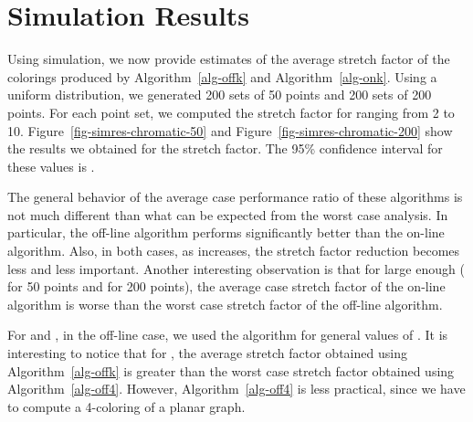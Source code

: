 \documentclass[pdftex,leqno,fleqn,12pts]{llncs}
\newcommand{\old}[1]{{}}
\begin{document}
\old{
\begin{theorem}
For any sequence  of points in the plane, the -coloring  computed by
Algorithm~\ref{alg-onk} has the -ellipse property, with 
, , , and
 for 
.
Moreover, there exist point sets such that no on-line coloring
algorithm can compute a -coloring that has the -ellipse property
for  smaller than 
, , , and

for . By Theorem~\ref{thm-wspd}, it is possible to
post-process the complete -partite graph induced by the
coloring computed by Algorithm 5 in order to obtain a
-spanner that has  edges.
\end{theorem}
}




\section{Simulation Results}\label{section-simres-chromatic}

Using simulation, we now provide estimates of the average stretch factor of the colorings produced by Algorithm~\ref{alg-offk} and Algorithm~\ref{alg-onk}. Using a uniform distribution, we generated 200 sets of 50 points and 200 sets of 200 points. For each point set, we computed the stretch factor for  ranging from 2 to 10. Figure~\ref{fig-simres-chromatic-50} and Figure~\ref{fig-simres-chromatic-200} show the results we obtained for the stretch factor. The 95\% confidence interval for these values is .

The general behavior of the average case performance ratio of these algorithms is not much different than what can be expected from the worst case analysis. In particular, the off-line algorithm performs significantly better than the on-line algorithm. Also, in both cases, as  increases, the stretch factor reduction becomes less and less important. Another interesting observation is that for  large enough ( for 50 points and  for 200 points), the average case stretch factor of the on-line algorithm is worse than the worst case stretch factor of the off-line algorithm.

For  and , in the off-line case, we used the algorithm for general values of . It is interesting to notice that for , the average stretch factor obtained using Algorithm~\ref{alg-offk} is greater than the worst case stretch factor obtained using Algorithm~\ref{alg-off4}. However, Algorithm~\ref{alg-off4} is less practical, since we have to compute a 4-coloring of a planar graph.
\end{document}
